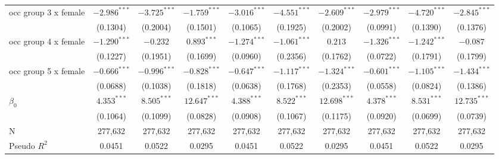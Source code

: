 \begin{tabular}{l|ccc|ccc|ccc|}
occ group 3 x female       &          $-2.986^{***}$ &  $-3.725^{***}$ &  $-1.759^{***}$ &           $-3.016^{***}$ &  $-4.551^{***}$ &  $-2.609^{***}$ &           $-2.979^{***}$ &  $-4.720^{***}$ &  $-2.845^{***}$ \\
                           &                (0.1304) &        (0.2004) &        (0.1501) &                 (0.1065) &        (0.1925) &        (0.2002) &                 (0.0991) &        (0.1390) &        (0.1376) \\
occ group 4 x female       &          $-1.290^{***}$ &        $-0.232$ &   $0.893^{***}$ &           $-1.274^{***}$ &  $-1.061^{***}$ &         $0.213$ &           $-1.326^{***}$ &  $-1.242^{***}$ &        $-0.087$ \\
                           &                (0.1227) &        (0.1951) &        (0.1699) &                 (0.0960) &        (0.2356) &        (0.1762) &                 (0.0722) &        (0.1791) &        (0.1799) \\
occ group 5 x female       &          $-0.666^{***}$ &  $-0.996^{***}$ &  $-0.828^{***}$ &           $-0.647^{***}$ &  $-1.117^{***}$ &  $-1.324^{***}$ &           $-0.601^{***}$ &  $-1.105^{***}$ &  $-1.434^{***}$ \\
                           &                (0.0688) &        (0.1038) &        (0.1818) &                 (0.0638) &        (0.1768) &        (0.2353) &                 (0.0558) &        (0.0824) &        (0.1386) \\
$\beta_0$                  &           $4.353^{***}$ &   $8.505^{***}$ &  $12.647^{***}$ &            $4.388^{***}$ &   $8.522^{***}$ &  $12.698^{***}$ &            $4.378^{***}$ &   $8.531^{***}$ &  $12.735^{***}$ \\
                           &                (0.1064) &        (0.1099) &        (0.0828) &                 (0.0908) &        (0.1067) &        (0.1175) &                 (0.0920) &        (0.0699) &        (0.0739) \\
N                          &                 277,632 &         277,632 &         277,632 &                  277,632 &         277,632 &         277,632 &                  277,632 &         277,632 &         277,632 \\
Pseudo $R^2$               &                  0.0451 &          0.0522 &          0.0295 &                   0.0451 &          0.0522 &          0.0295 &                   0.0451 &          0.0522 &          0.0295 \\
\bottomrule
\end{tabular}
